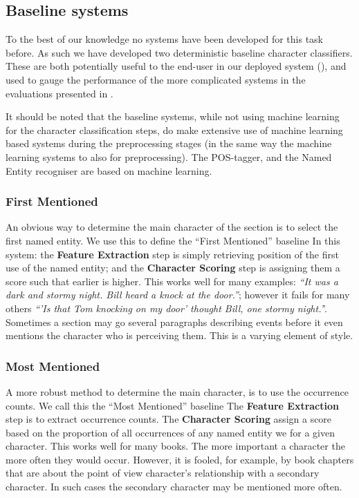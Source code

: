 \documentclass[11pt,a4paper]{article}
\begin{document}
\subsection{Baseline systems}
To the best of our knowledge no systems have been developed for this task before.
As such we have developed two deterministic baseline character classifiers.
These are both potentially useful to the end-user in our deployed system (), and used to gauge the performance of the more complicated systems in the evaluations presented in .

It should be noted that the baseline systems, while not using machine learning for the  character classification steps, do make extensive use of machine learning based systems during the preprocessing stages (in the same way the machine learning systems to also for preprocessing).
The POS-tagger, and the Named Entity recogniser are based on machine learning.

\subsubsection{First Mentioned}
An obvious way to determine the main character of the section is to select the first named entity.
We use this to define the ``First Mentioned'' baseline
In this system: the \textbf{Feature Extraction} step is simply retrieving position of the first use of the named entity;
and the \textbf{Character Scoring} step is assigning them a score such that earlier is higher.
This works well for many examples: \emph{``It was a dark and stormy night. Bill heard a knock at the door.''};
however it fails for many others \emph{``'Is that Tom knocking on my door' thought Bill, one stormy night.'}'.
Sometimes a section  may go several paragraphs describing events before it even mentions the character who is perceiving them.
This is a varying element of style.

\subsubsection{Most Mentioned}
A more robust method to determine the main character, is to use the occurrence counts.
We call this the ``Most Mentioned'' baseline
The \textbf{Feature Extraction} step is to extract occurrence counts.
The \textbf{Character Scoring} assign a score based on the proportion of all occurrences of any named entity we for a given character.
This works well for many books.
The more important a character the more often they would occur.
However, it is fooled, for example, by book chapters that are about the point of view character's relationship with a secondary character.
In such cases the secondary character may be mentioned more often.
\end{document}
